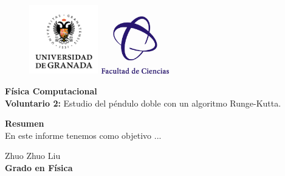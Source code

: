 \documentclass[11pt, twoside]{article} %
\begin{document}
\begin{figure}[h!]
	\includegraphics[width=3cm]{Icons/ugr.jpg}
	\endminipage
	\includegraphics[height = 2.5cm, width=3cm]{Icons/facultad_ciencias.png}
	\endminipage
\end{figure}

\vspace{0.3cm}

\begin{center}
    \Huge \textbf{Física Computacional}\\
    		\vspace{0.4cm}
    \LARGE \textbf{Voluntario 2:}  
    Estudio del péndulo doble con un algoritmo Runge-Kutta.
\end{center}

\vspace{1cm}

\vspace{1cm}

\begin{center}
    \large \textbf{Resumen}\\
    		\vspace{0.2cm}
    \normalsize
    En este informe tenemos como objetivo ...

\end{center}

\vspace{1cm}

\begin{flushright}
    \large Zhuo Zhuo Liu 
    \\
    \vspace{0.4cm}
    \textbf{Grado en Física}
\end{flushright}

\newpage

\setcounter{page}{0}
\tableofcontents
\newpage
\end{document}
